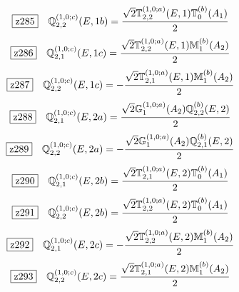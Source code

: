 \documentclass[fleqn,10pt,landscape]{jsarticle}
\begin{document}
\begin{dmath*}
\hspace*{3mm}\fbox{z285}\quad \mathbb{Q}_{2,2}^{(1,0;c)}(E,1b)=\frac{\sqrt{2} \mathbb{T}_{2,2}^{(1,0;a)}(E,1) \mathbb{T}_{0}^{(b)}(A_{1})}{2}
\end{dmath*}
\begin{dmath*}
\hspace*{3mm}\fbox{z286}\quad \mathbb{Q}_{2,1}^{(1,0;c)}(E,1c)=\frac{\sqrt{2} \mathbb{T}_{2,2}^{(1,0;a)}(E,1) \mathbb{M}_{1}^{(b)}(A_{2})}{2}
\end{dmath*}
\begin{dmath*}
\hspace*{3mm}\fbox{z287}\quad \mathbb{Q}_{2,2}^{(1,0;c)}(E,1c)=- \frac{\sqrt{2} \mathbb{T}_{2,1}^{(1,0;a)}(E,1) \mathbb{M}_{1}^{(b)}(A_{2})}{2}
\end{dmath*}
\begin{dmath*}
\hspace*{3mm}\fbox{z288}\quad \mathbb{Q}_{2,1}^{(1,0;c)}(E,2a)=\frac{\sqrt{2} \mathbb{G}_{1}^{(1,0;a)}(A_{2}) \mathbb{Q}_{2,2}^{(b)}(E,2)}{2}
\end{dmath*}
\begin{dmath*}
\hspace*{3mm}\fbox{z289}\quad \mathbb{Q}_{2,2}^{(1,0;c)}(E,2a)=- \frac{\sqrt{2} \mathbb{G}_{1}^{(1,0;a)}(A_{2}) \mathbb{Q}_{2,1}^{(b)}(E,2)}{2}
\end{dmath*}
\begin{dmath*}
\hspace*{3mm}\fbox{z290}\quad \mathbb{Q}_{2,1}^{(1,0;c)}(E,2b)=\frac{\sqrt{2} \mathbb{T}_{2,1}^{(1,0;a)}(E,2) \mathbb{T}_{0}^{(b)}(A_{1})}{2}
\end{dmath*}
\begin{dmath*}
\hspace*{3mm}\fbox{z291}\quad \mathbb{Q}_{2,2}^{(1,0;c)}(E,2b)=\frac{\sqrt{2} \mathbb{T}_{2,2}^{(1,0;a)}(E,2) \mathbb{T}_{0}^{(b)}(A_{1})}{2}
\end{dmath*}
\begin{dmath*}
\hspace*{3mm}\fbox{z292}\quad \mathbb{Q}_{2,1}^{(1,0;c)}(E,2c)=- \frac{\sqrt{2} \mathbb{T}_{2,2}^{(1,0;a)}(E,2) \mathbb{M}_{1}^{(b)}(A_{2})}{2}
\end{dmath*}
\begin{dmath*}
\hspace*{3mm}\fbox{z293}\quad \mathbb{Q}_{2,2}^{(1,0;c)}(E,2c)=\frac{\sqrt{2} \mathbb{T}_{2,1}^{(1,0;a)}(E,2) \mathbb{M}_{1}^{(b)}(A_{2})}{2}
\end{dmath*}
\end{document}
